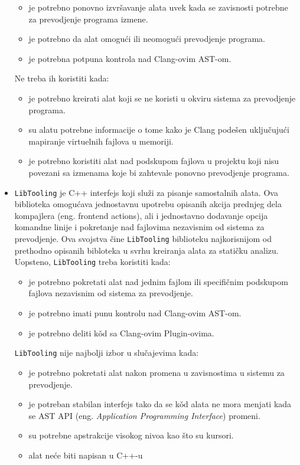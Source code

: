 \documentclass[12pt,oneside]{memoir}
\begin{document}
\begin{itemize}
\begin{itemize}
\item je potrebno ponovno izvr\v{s}avanje alata uvek kada se zavisnosti potrebne za prevodjenje programa izmene.
\item je potrebno da alat omogu\'{c}i ili neomogu\'{c}i prevodjenje programa.
\item je potrebna potpuna kontrola nad Clang-ovim AST-om.
\end{itemize}
Ne treba ih koristiti kada:
\begin{itemize}
\item je potrebno kreirati alat koji se ne koristi u okviru sistema za prevodjenje programa.
\item su alatu potrebne informacije o tome kako je Clang pode\v{s}en uklju\v{c}uju\'{c}i mapiranje virtuelnih fajlova u memoriji.
\item je potrebno koristiti alat nad podskupom fajlova u projektu koji nisu povezani sa izmenama koje bi zahtevale ponovno prevodjenje programa.
\end{itemize}

\item \lstinline{LibTooling} je C++ interfejs koji slu\v{z}i za pisanje samostalnih alata. Ova biblioteka omogu\'{c}ava jednostavnu
upotrebu opisanih akcija prednjeg dela kompajlera (eng. frontend actions), ali i jednostavno dodavanje opcija komandne linije i pokretanje nad fajlovima 
nezavisnim od sistema za prevodjenje. Ova svojstva \v{c}ine \lstinline{LibTooling} biblioteku najkorisnijom od prethodno opisanih bibloteka u svrhu kreiranja alata za stati\v{c}ku analizu.
Uopsteno, \lstinline{LibTooling} treba koristiti kada:
\begin{itemize}
  \item je potrebno pokretati alat nad jednim fajlom ili specifi\v{c}nim podskupom fajlova nezavisnim od sistema za prevodjenje.
  \item je potrebno imati punu kontrolu nad Clang-ovim AST-om.
  \item je potrebno deliti k\v{o}d sa Clang-ovim Plugin-ovima.
\end{itemize}
\lstinline{LibTooling} nije najbolji izbor u slu\v{c}ajevima kada:
\begin{itemize}
  \item je potrebno pokretati alat nakon promena u zavisnostima u sistemu za prevodjenje.
  \item je potreban stabilan interfejs tako da se k\v{o}d alata ne mora menjati kada se AST API (eng. \textit{Application Programming Interface}) promeni.
  \item su potrebne apstrakcije visokog nivoa kao \v{s}to su kursori.
  \item alat ne\'{c}e biti napisan u C++-u
\end{itemize}
\end{itemize}
\end{document}
